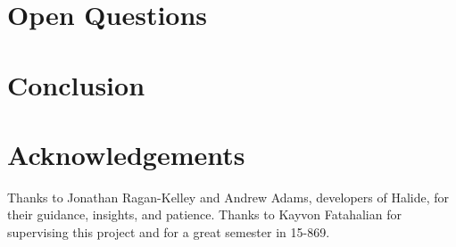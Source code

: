 \documentclass{article}
\begin{document}
\section{Open Questions}

\label{sec:future-tiles}

\section{Conclusion}

\section*{Acknowledgements}

Thanks to Jonathan Ragan-Kelley and Andrew Adams, developers of Halide, for their guidance, insights, and patience. Thanks to Kayvon Fatahalian for supervising this project and for a great semester in 15-869.

{}

\end{document}

